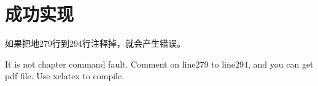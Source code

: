 \documentclass[master,xetex,arialtitle]{tongjithesis}
\begin{document}
\graphicspath{{figures/}}


\frontmatter

\makecover



\tableofcontents

%




\mainmatter
\chapter{成功实现}
\par 如果把地279行到294行注释掉，就会产生错误。
\par It is not chapter command fault. Comment on line279 to line294, and you can get
pdf file. Use xelatex to compile.


\backmatter

\makeatother




%

%

%
\end{document}
